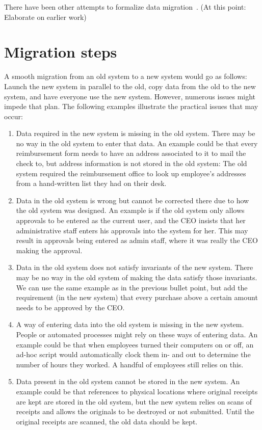 \documentclass{elsarticle}
\begin{document}
   There have been other attempts to formalize data migration~\cite{Thalheim2013}.
   (At this point: Elaborate on earlier work)

\section{Migration steps}
   A smooth migration from an old system to a new system would go as follows:
   Launch the new system in parallel to the old, copy data from the old to the new system, and have everyone use the new system.
   However, numerous issues might impede that plan.
   The following examples illustrate the practical issues that may occur:
\begin{enumerate}
\item Data required in the new system is missing in the old system.
   There may be no way in the old system to enter that data.
   An example could be that every reimbursement form needs to have an address associated to it to mail the check to, but address information is not stored in the old system:
   The old system required the reimbursement office to look up employee's addresses from a hand-written list they had on their desk.
\item Data in the old system is wrong but cannot be corrected there due to how the old system was designed.
   An example is if the old system only allows approvals to be entered as the current user, and the CEO insists that her administrative staff enters his approvals into the system for her.
   This may result in approvals being entered as admin staff, where it was really the CEO making the approval.
\item Data in the old system does not satisfy invariants of the new system.
   There may be no way in the old system of making the data satisfy those invariants. We can use the same example as in the previous bullet point, but add the requirement (in the new system) that every purchase above a certain amount needs to be approved by the CEO.
\item A way of entering data into the old system is missing in the new system.
   People or automated processes might rely on these ways of entering data.
   An example could be that when employees turned their computers on or off, an ad-hoc script would automatically clock them in- and out to determine the number of hours they worked.
   A handful of employees still relies on this.
\item Data present in the old system cannot be stored in the new system.
   An example could be that references to physical locations where original receipts are kept are stored in the old system, but the new system relies on scans of receipts and allows the originals to be destroyed or not submitted.
   Until the original receipts are scanned, the old data should be kept.
\end{enumerate}
\end{document}
